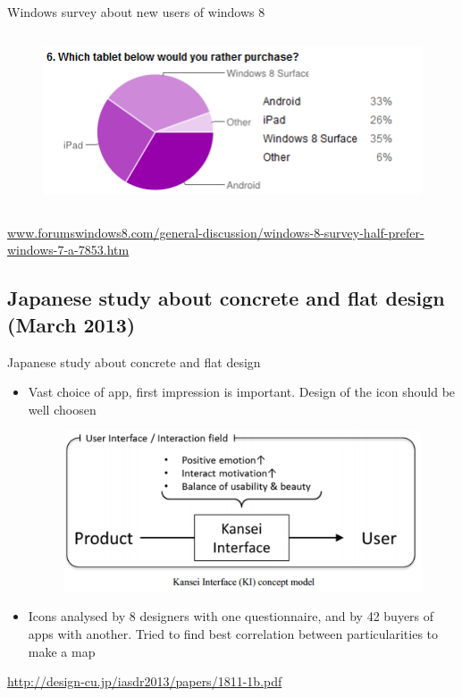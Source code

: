 \documentclass{beamer}
\begin{document}
\begin{frame}{Windows survey about new users of windows 8}
\begin{columns}[c]
\begin{figure}
        \centering
        \includegraphics[scale=0.25]{windows8Tablet.png}
      \end{figure}

	\end{columns}
	\begin{flushright}\tiny\url{www.forumswindows8.com/general-discussion/windows-8-survey-half-prefer-windows-7-a-7853.htm}\normalsize\end{flushright}
\end{frame}



\subsection{Japanese study about concrete and flat design (March 2013)}
\begin{frame}{Japanese study about concrete and flat design}
	\begin{itemize}
    \item Vast choice of app, first impression is important. Design of the icon should be well choosen\\
    \begin{figure}
        \centering
        \includegraphics[scale=0.5]{UI.png}
      \end{figure}
    \item Icons analysed by 8 designers with one questionnaire, and by 42 buyers of apps with another. Tried to find best correlation between particularities to make a map
    \end{itemize}
	\begin{flushright}\tiny\url{http://design-cu.jp/iasdr2013/papers/1811-1b.pdf}\normalsize\end{flushright}
\end{frame}
\end{document}
